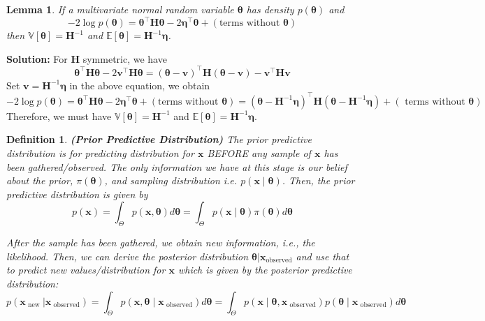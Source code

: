 \documentclass[11pt]{article}
\theoremstyle{plain} %
\newtheorem{lemma}[theorem]{Lemma}
\newtheorem{definition}[theorem]{Definition}
\newenvironment{solution}
{\color{C2}\normalfont\begin{framed}\begingroup\textbf{Solution:} }
  {\endgroup\end{framed}}
\theoremstyle{remark}
\begin{document}
\begin{lemma}\label{lemma: gaussian}
  If a multivariate normal random variable $\boldsymbol{\theta}$ has density $p(\boldsymbol{\theta})$ and
  $$
    -2 \log p(\boldsymbol{\theta})=\boldsymbol{\theta}^\top \boldsymbol{H} \boldsymbol{\theta}-2 \boldsymbol{\eta}^\top \boldsymbol{\theta}+(\text{terms without } \boldsymbol{\theta})
  $$
  then $\mathbb{V}[\boldsymbol{\theta}]=\boldsymbol{H}^{-1}$ and $\mathbb{E} [\boldsymbol{\theta}] =\boldsymbol{H}^{-1} \boldsymbol{\eta}$.
\end{lemma}
\begin{solution}
  For $\boldsymbol{H}$ symmetric, we have
  $$
    \boldsymbol{\theta}^\top \boldsymbol{H} \boldsymbol{\theta}-2 \boldsymbol{v}^\top \boldsymbol{H} \boldsymbol{\theta}=(\boldsymbol{\theta}-\boldsymbol{v})^\top \boldsymbol{H}(\boldsymbol{\theta}-\boldsymbol{v})-\boldsymbol{v}^\top \boldsymbol{H} \boldsymbol{v}
  $$
  Set $\boldsymbol{v}= \boldsymbol{H}^{-1} \boldsymbol{\eta}$ in the above equation, we obtain
  $$
    -2 \log p(\boldsymbol{\theta})=\boldsymbol{\theta}^\top \boldsymbol{H} \boldsymbol{\theta}-2 \boldsymbol{\eta}^\top \boldsymbol{\theta}+(\text{terms without } \boldsymbol{\theta}) = (\boldsymbol{\theta}-\boldsymbol{H}^{-1} \boldsymbol{\eta})^\top \boldsymbol{H}(\boldsymbol{\theta}-\boldsymbol{H}^{-1} \boldsymbol{\eta}) + (\text { terms without } \boldsymbol{\theta})
  $$
  Therefore, we must have $\mathbb{V}[\boldsymbol{\theta}]=\boldsymbol{H}^{-1}$ and $\mathbb{E} [\boldsymbol{\theta}] =\boldsymbol{H}^{-1} \boldsymbol{\eta}$.
\end{solution}

\begin{definition}\textbf{(Prior Predictive Distribution)}
  The prior predictive distribution is for predicting distribution for $\boldsymbol{x}$ BEFORE any sample of $\boldsymbol{x}$ has been
  gathered/observed. The only information we have at this stage is our belief about the
  prior, $\pi(\boldsymbol{\theta})$, and sampling distribution i.e. $p\left(\boldsymbol{x}
    \mid \boldsymbol{\theta}\right)$. Then, the prior predictive distribution is given by
  $$
    p(\boldsymbol{x}) =\int_{\Theta} p(\boldsymbol{x}, \boldsymbol{\theta}) d \boldsymbol{\theta} =\int_{\Theta} p(\boldsymbol{x} \mid \boldsymbol{\theta}) \pi(\boldsymbol{\theta}) d \boldsymbol{\theta}
  $$

  After the sample has been gathered, we obtain new information, i.e., the
  likelihood. Then, we can derive the posterior distribution
  $\boldsymbol{\theta} | \boldsymbol{x}_{\text{observed}}$ and use that to predict
  new values/distribution for $\boldsymbol{x}$ which is given by the posterior predictive
  distribution:
  $$
    p(\boldsymbol{x}_{\text{ new }} | \boldsymbol{x}_{\text{ observed}})
    =\int_{\Theta} p(\boldsymbol{x}, \boldsymbol{\theta} \mid \boldsymbol{x}_{\text{ observed}}) d \boldsymbol{\theta}
    =\int_{\Theta} p(\boldsymbol{x} \mid \boldsymbol{\theta}, \boldsymbol{x}_{\text{ observed}}) p(\boldsymbol{\theta} \mid \boldsymbol{x}_{\text{ observed}}) d \boldsymbol{\theta}
  $$
\end{definition}
\end{document}

